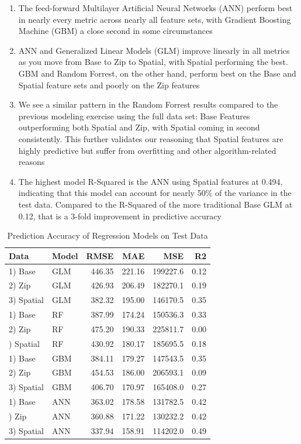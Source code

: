 \documentclass[12pt,]{article}
\providecommand{\tightlist}{%
  \setlength{\itemsep}{0pt}\setlength{\parskip}{0pt}}
\begin{document}
\begin{enumerate}
\def\labelenumi{\arabic{enumi})}
\tightlist
\item
  The feed-forward Multilayer Artificial Neural Networks (ANN) perform
  best in nearly every metric across nearly all feature sets, with
  Gradient Boosting Machine (GBM) a close second in some circumstances
\item
  ANN and Generalized Linear Models (GLM) improve linearly in all
  metrics as you move from Base to Zip to Spatial, with Spatial
  performing the best. GBM and Random Forrest, on the other hand,
  perform best on the Base and Spatial feature sets and poorly on the
  Zip features
\item
  We see a similar pattern in the Random Forrest results compared to the
  previous modeling exercise using the full data set: Base Features
  outperforming both Spatial and Zip, with Spatial coming in second
  consistently. This further validates our reasoning that Spatial
  features are highly predictive but suffer from overfitting and other
  algorithm-related reasons
\item
  The highest model R-Squared is the ANN using Spatial features at
  0.494, indicating that this model can account for nearly 50\% of the
  variance in the test data. Compared to the R-Squared of the more
  traditional Base GLM at 0.12, that is a 3-fold improvement in
  predictive accuracy
\end{enumerate}

\begin{table}

\caption{\label{tab:Reg Model RMSE Compare}\label{tab:RegModelTable} Prediction Accuracy of Regression Models on Test Data}
\centering
\begin{tabular}[t]{llrrrr}
\toprule
Data & Model & RMSE & MAE & MSE & R2\\
\midrule
1) Base & GLM & 446.35 & 221.16 & 199227.6 & 0.12\\
2) Zip & GLM & 426.93 & 206.49 & 182270.1 & 0.19\\
3) Spatial & GLM & 382.32 & 195.00 & 146170.5 & 0.35\\
1) Base & RF & 387.99 & 174.24 & 150536.3 & 0.33\\
2) Zip & RF & 475.20 & 190.33 & 225811.7 & 0.00\\
\addlinespace
3) Spatial & RF & 430.92 & 180.17 & 185695.5 & 0.18\\
1) Base & GBM & 384.11 & 179.27 & 147543.5 & 0.35\\
2) Zip & GBM & 454.53 & 186.00 & 206593.1 & 0.09\\
3) Spatial & GBM & 406.70 & 170.97 & 165408.0 & 0.27\\
1) Base & ANN & 363.02 & 178.58 & 131782.5 & 0.42\\
\addlinespace
2) Zip & ANN & 360.88 & 171.22 & 130232.2 & 0.42\\
3) Spatial & ANN & 337.94 & 158.91 & 114202.0 & 0.49\\
\bottomrule
\end{tabular}
\end{table}
\end{document}
